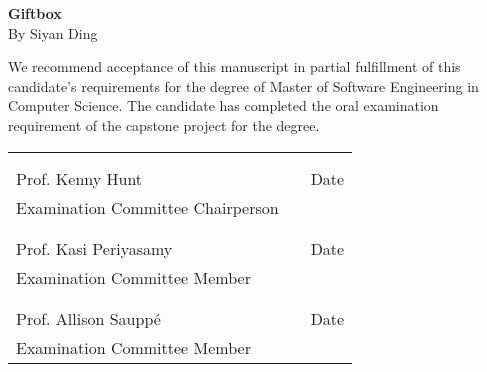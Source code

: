 \thispagestyle{empty}
\vspace*{0.3in}
\begin{center}
	\large{\textbf{Giftbox}} \\ 
	\vspace{0.75in}
	\normalsize{By Siyan Ding}
\end{center}

\vspace{0.5in}
\noindent We recommend acceptance of this manuscript in partial fulfillment of this candidate's requirements for the degree of Master of Software Engineering in Computer Science. The candidate has completed the oral examination requirement of the capstone project for the degree. \\

\noindent
\begin{tabularx}{\textwidth}{p{3in}Xp{2in}}
	\rule{0pt}{50pt} & & \\
	\hrulefill & & \hrulefill \\
	Prof. Kenny Hunt & & Date \\
	Examination Committee Chairperson & & \\
	\rule{0pt}{50pt} & & \\
	\hrulefill & & \hrulefill \\
	Prof. Kasi Periyasamy & & Date \\
	Examination Committee Member & & \\
	\rule{0pt}{50pt} & & \\
	\hrulefill & & \hrulefill \\
	Prof. Allison Sauppé & & Date \\
	Examination Committee Member & & \\
\end{tabularx}

